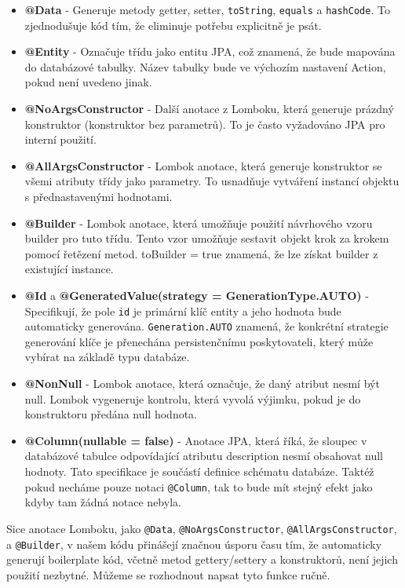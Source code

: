 \begin{itemize}
    \item \textbf{@Data} - Generuje metody getter, setter, \texttt{toString}, \texttt{equals} a \texttt{hashCode}. To zjednodušuje kód tím, že eliminuje potřebu explicitně je psát.
    \item \textbf{@Entity} - Označuje třídu jako entitu JPA, což znamená, že bude mapována do databázové tabulky. Název tabulky bude ve výchozím nastavení Action, pokud není uvedeno jinak.
    \item \textbf{@NoArgsConstructor} - Další anotace z Lomboku, která generuje prázdný konstruktor (konstruktor bez parametrů). To je často vyžadováno JPA pro interní použití.
    \item \textbf{@AllArgsConstructor} - Lombok anotace, která generuje konstruktor se všemi atributy třídy jako parametry. To usnadňuje vytváření instancí objektu s přednastavenými hodnotami.
    \item \textbf{@Builder} - Lombok anotace, která umožňuje použití návrhového vzoru builder pro tuto třídu. Tento vzor umožňuje sestavit objekt krok za krokem pomocí řetězení metod. toBuilder = true znamená, že lze získat builder z existující instance.
    \item \textbf{@Id} a \textbf{@GeneratedValue(strategy = GenerationType.AUTO)} - Specifikují, že pole \texttt{id} je primární klíč entity a jeho hodnota bude automaticky generována. \texttt{Generation.AUTO} znamená, že konkrétní strategie generování klíče je přenechána persistenčnímu poskytovateli, který může vybírat na základě typu databáze.
    \item \textbf{@NonNull} - Lombok anotace, která označuje, že daný atribut nesmí být null. Lombok vygeneruje kontrolu, která vyvolá výjimku, pokud je do konstruktoru předána null hodnota.
    \item \textbf{@Column(nullable = false)} - Anotace JPA, která říká, že sloupec v databázové tabulce odpovídající atributu description nesmí obsahovat null hodnoty. Tato specifikace je součástí definice schématu databáze. Taktéž pokud necháme pouze notaci \texttt{@Column}, tak to bude mít stejný efekt jako kdyby tam žádná notace nebyla.
\end{itemize}

Sice anotace Lomboku, jako \texttt{@Data}, \texttt{@NoArgsConstructor}, \texttt{@AllArgsConstructor}, a \texttt{@Builder}, v našem kódu přinášejí značnou úsporu času tím, že automaticky generují boilerplate kód, včetně metod gettery/settery a konstruktorů, není jejich použití nezbytné. Můžeme se rozhodnout napsat tyto funkce ručně.


